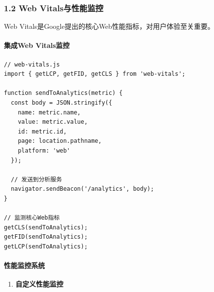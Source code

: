 \subsubsection{1.2 Web
Vitals与性能监控}\label{web-vitalsux4e0eux6027ux80fdux76d1ux63a7}

Web Vitals是Google提出的核心Web性能指标，对用户体验至关重要。

\paragraph{集成Web Vitals监控}\label{ux96c6ux6210web-vitalsux76d1ux63a7}

\begin{lstlisting}
// web-vitals.js
import { getLCP, getFID, getCLS } from 'web-vitals';

function sendToAnalytics(metric) {
  const body = JSON.stringify({
    name: metric.name,
    value: metric.value,
    id: metric.id,
    page: location.pathname,
    platform: 'web'
  });
  
  // 发送到分析服务
  navigator.sendBeacon('/analytics', body);
}

// 监测核心Web指标
getCLS(sendToAnalytics);
getFID(sendToAnalytics);
getLCP(sendToAnalytics);
\end{lstlisting}

\paragraph{性能监控系统}\label{ux6027ux80fdux76d1ux63a7ux7cfbux7edf}

\begin{enumerate}
\def\labelenumi{\arabic{enumi}.}
\tightlist
\item
  \textbf{自定义性能监控}
\end{enumerate}

